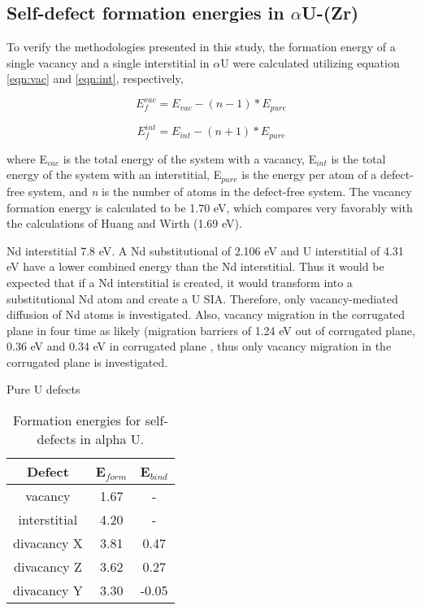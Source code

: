 \documentclass[review]{elsarticle}
\begin{document}
\subsection{Self-defect formation energies in $\alpha$U-(Zr)}

To verify the methodologies presented in this study, the formation energy of a single vacancy and a single interstitial in $\alpha$U were calculated utilizing equation \ref{eqn:vac} and \ref{eqn:int}, respectively,

\begin{equation}
\label{eqn:vac}
E_{f}^{vac} = E_{vac} - (n-1)*E_{pure}
\end{equation} 

\begin{equation}
\label{eqn:int}
E_{f}^{int} = E_{int} - (n+1)*E_{pure}
\end{equation} 

where E$_{vac}$ is the total energy of the system with a vacancy, E$_{int}$ is the total energy of the system with an interstitial, E$_{pure}$ is the energy per atom of a defect-free system, and \textit{n} is the number of atoms in the defect-free system. The vacancy formation energy is calculated to be 1.70 eV, which compares very favorably with the calculations of Huang and Wirth \cite{wirth2011} (1.69 eV).  

Nd interstitial 7.8 eV.  A Nd substitutional of 2.106 eV and U interstitial of 4.31 eV \cite{wirth2012} have a lower combined energy than the Nd interstitial.  Thus it would be expected that if a Nd interstitial is created, it would transform into a substitutional Nd atom and create a U SIA.  Therefore, only vacancy-mediated diffusion of Nd atoms is investigated.  Also, vacancy migration in the corrugated plane in four time as likely (migration barriers of 1.24 eV out of corrugated plane, 0.36 eV and 0.34 eV in corrugated plane \cite{wirth2011}, thus only vacancy migration in the corrugated plane is investigated.  

Pure U defects

\begin{table}[h!]
\caption{Formation energies for self-defects in alpha U.}
\label{tab:Eforms}
\begin{center}
\begin{tabular}{|c|c|c|}
     \hline
      Defect & E$_{form}$ & E$_{bind}$ \\
     \hline
     vacancy & 1.67 & - \\
     interstitial & 4.20 & - \\
     divacancy X & 3.81 & 0.47 \\
     divacancy Z & 3.62 & 0.27 \\
     divacancy Y & 3.30 & -0.05 \\
       \hline
\end{tabular}
\end{center}
\label{default}
\end{table}%
\end{document}
